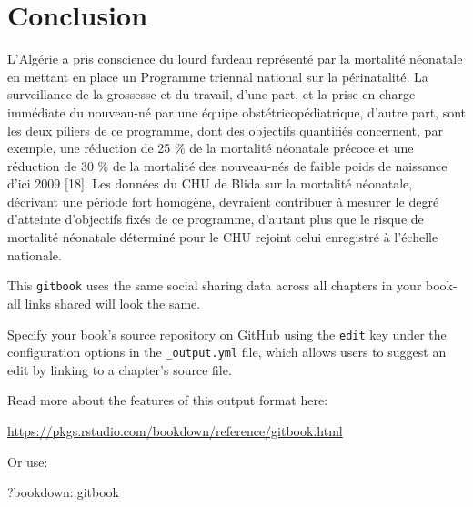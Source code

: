 \documentclass[
]{book}
\newenvironment{Shaded}{\begin{snugshade}}{\end{snugshade}}
\newcommand{\NormalTok}[1]{#1}
\newcommand{\SpecialCharTok}[1]{\textcolor[rgb]{0.00,0.00,0.00}{#1}}
\begin{document}
\hypertarget{conclusion}{%
\chapter{Conclusion}\label{conclusion}}

L'Algérie a pris conscience du lourd fardeau représenté par la
mortalité néonatale en mettant en place un Programme
triennal national sur la périnatalité. La surveillance de la
grossesse et du travail, d'une part, et la prise en charge
immédiate du nouveau-né par une équipe obstétricopédiatrique,
d'autre part, sont les deux piliers de ce programme,
dont des objectifs quantifiés concernent, par exemple, une
réduction de 25 \% de la mortalité néonatale précoce et une
réduction de 30 \% de la mortalité des nouveau-nés de faible
poids de naissance d'ici 2009 {[}18{]}.
Les données du CHU de Blida sur la mortalité néonatale,
décrivant une période fort homogène, devraient contribuer
à mesurer le degré d'atteinte d'objectifs fixés de ce
programme, d'autant plus que le risque de mortalité
néonatale déterminé pour le CHU rejoint celui enregistré à
l'échelle nationale.

This \texttt{gitbook} uses the same social sharing data across all chapters in your book- all links shared will look the same.

Specify your book's source repository on GitHub using the \texttt{edit} key under the configuration options in the \texttt{\_output.yml} file, which allows users to suggest an edit by linking to a chapter's source file.

Read more about the features of this output format here:

\url{https://pkgs.rstudio.com/bookdown/reference/gitbook.html}

Or use:

\begin{Shaded}
\begin{Highlighting}[]
\NormalTok{?bookdown}\SpecialCharTok{::}\NormalTok{gitbook}
\end{Highlighting}
\end{Shaded}


  
\end{document}
